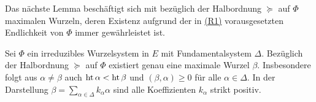 Das nächste Lemma beschäftigt sich mit bezüglich der Halbordnung $\succeq$ auf $\Phi$ maximalen Wurzeln, deren Existenz aufgrund der in \hyperref[it:R1]{(R1)} vorausgesetzten Endlichkeit von $\Phi$ immer gewährleistet ist. 

\begin{lem}
  \label{lem:maximalRoot}
  Sei $\Phi$ ein irreduzibles Wurzelsystem in $E$ mit Fundamentalsystem $\Delta$.
  Bezüglich der Halbordnung $\succeq$ auf $\Phi$ existiert genau eine maximale Wurzel $\beta$.
  Insbesondere folgt aus $\alpha \neq \beta$ auch $\operatorname{ht} \alpha < \operatorname{ht} \beta$ und $(\beta, \alpha) \geq 0$ für alle $\alpha \in \Delta$.
  In der Darstellung $\beta = \sum_{\alpha \in \Delta} k_\alpha \alpha$ sind alle Koeffizienten $k_\alpha$ strikt positiv.
\end{lem}

